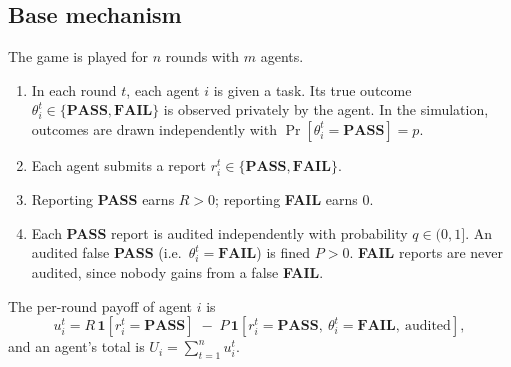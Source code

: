 \documentclass[11pt]{article}
\theoremstyle{definition}
\theoremstyle{remark}
\newcommand{\PASS}{\textbf{PASS}}
\newcommand{\FAIL}{\textbf{FAIL}}
\newcommand{\1}{\mathbf{1}}
\begin{document}
\subsection{Base mechanism}
The game is played for $n$ rounds with $m$ agents.
\begin{enumerate}
    \item In each round $t$, each agent $i$ is given a task. Its true outcome
    $\theta_i^t\in\{\PASS,\FAIL\}$ is observed privately by the agent. In the
    simulation, outcomes are drawn independently with $\Pr[\theta_i^t=\PASS]=p$.
    \item Each agent submits a report $r_i^t\in\{\PASS,\FAIL\}$.
    \item Reporting \PASS{} earns $R>0$; reporting \FAIL{} earns $0$.
    \item Each \PASS{} report is audited independently with probability $q\in(0,1]$.
    An audited false \PASS{} (i.e.\ $\theta_i^t=\FAIL$) is fined $P>0$. \FAIL{} reports
    are never audited, since nobody gains from a false \FAIL{}.
\end{enumerate}
The per-round payoff of agent $i$ is
\begin{equation}\label{eq:payoff}
  u_i^t = R\,\1[r_i^t=\PASS] \;-\; P\,\1[r_i^t=\PASS,\ \theta_i^t=\FAIL,\ \text{audited}],
\end{equation}
and an agent's total is $U_i=\sum_{t=1}^n u_i^t$.
\end{document}
